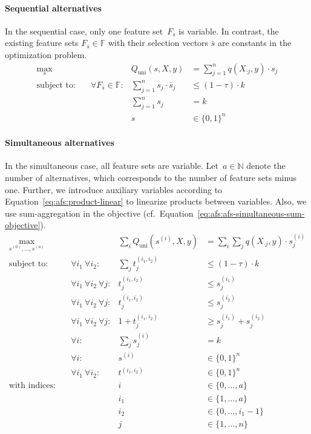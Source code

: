 \documentclass{article}
\theoremstyle{definition}
\begin{document}
\paragraph{Sequential alternatives}

In the sequential case, only one feature set~$F_s$ is variable.
In contrast, the existing feature sets $F_{\bar{s}} \in \mathbb{F}$ with their selection vectors $\bar{s}$ are constants in the optimization problem.
%
\begin{equation}
	\begin{aligned}
		\max_s &\quad & Q_{\text{uni}}(s,X,y) &= \sum_{j=1}^{n} q(X_{\cdot{}j},y) \cdot s_j \\
		\text{subject to:} &\quad \forall F_{\bar{s}} \in \mathbb{F}: & \sum_{j=1}^n s_j \cdot \bar{s}_j &\leq (1 - \tau) \cdot k \\
		&\quad & \sum_{j=1}^n s_j &= k \\
		&\quad & s &\in \{0,1\}^n
	\end{aligned}
	\label{eq:afs:afs-sequential-complete}
\end{equation}
%
\paragraph{Simultaneous alternatives}

In the simultaneous case, all feature sets are variable.
Let~$a \in \mathbb{N}$ denote the number of alternatives, which corresponds to the number of feature sets minus one.
Further, we introduce auxiliary variables according to Equation~\ref{eq:afs:product-linear} to linearize products between variables.
Also, we use sum-aggregation in the objective (cf.~Equation~\ref{eq:afs:afs-simultaneous-sum-objective}).
%
\begin{equation}
	\begin{aligned}
		\max_{s^{(0)}, \dots, s^{(a)}} &\quad & \sum_i Q_{\text{uni}}(s^{(i)},X,y) &= \sum_i \sum_j q(X_{\cdot{}j},y) \cdot s^{(i)}_j\\
		\text{subject to:} &\quad \forall i_1~\forall i_2: & \sum_j t^{(i_1,i_2)}_j &\leq (1 - \tau) \cdot k \\
		&\quad \forall i_1~\forall i_2~\forall j: & t^{(i_1,i_2)}_j &\leq s^{(i_1)}_j \\
		&\quad \forall i_1~\forall i_2~\forall j: & t^{(i_1,i_2)}_j &\leq s^{(i_2)}_j \\
		&\quad \forall i_1~\forall i_2~\forall j: & 1 + t^{(i_1,i_2)}_j &\geq s^{(i_1)}_j + s^{(i_2)}_j \\
		&\quad \forall i: & \sum_j s^{(i)}_j &= k \\
		&\quad \forall i: & s^{(i)} &\in \{0,1\}^n \\
		&\quad \forall i_1~\forall i_2: & t^{(i_1,i_2)} &\in \{0,1\}^n \\
		\text{with indices:} &\quad & i &\in \{0, \dots, a\} \\
		&\quad & i_1 &\in \{1, \dots, a\} \\
		&\quad & i_2 &\in \{0, \dots, i_1-1\} \\
		&\quad & j &\in \{1, \dots, n\}
	\end{aligned}
	\label{eq:afs:afs-simultaneous-complete}
\end{equation}
\end{document}
